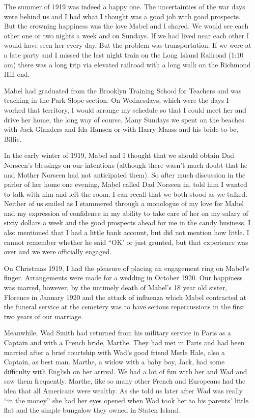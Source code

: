 \documentclass[12pt]{book}              %
\begin{document}

The summer of 1919 was indeed a happy one. The uncertainties of the war days were behind us and I had what I thought was a good job with good prospects. But the crowning happiness was the love Mabel and I shared. We would see each other one or two nights a week and on Sundays. If we had lived near each other I would have seen her every day. But the problem was transportation. If we were at a late party and I missed the last night train on the Long Island Railroad (1:10 am) there was a long trip via elevated railroad with a long walk on the Richmond Hill end. 

Mabel had graduated from the Brooklyn Training School for Teachers and was teaching in the Park Slope section. On Wednesdays, which were the days I worked that territory, I would arrange my schedule so that I could meet her and drive her home, the long way of course. Many Sundays we spent on the beaches with Jack Glanders and Ida Hansen or with Harry Maass and his bride-to-be, Billie. 

In the early winter of 1919, Mabel and I thought that we should obtain Dad Norseen's blessings on our intentions (although there wasn't much doubt that he and Mother Norseen had not anticipated them). So after much discussion in the parlor of her home one evening, Mabel called Dad Norseen in, told him I wanted to talk with him and left the room. I can recall that we both stood as we talked. Neither of us smiled as I stammered through a monologue of my love for Mabel and my expression of confidence in my ability to take care of her on my salary of sixty dollars a week and the good prospects ahead for me in the candy business. I also mentioned that I had a little bank account, but did not mention how little. I cannot remember whether he said ``OK' or just grunted, but that experience was over and we were officially engaged. 

On Christmas 1919, I had the pleasure of placing an engagement ring on Mabel's finger. Arrangements were made for a wedding in October 1920. Our happiness was marred, however, by the untimely death of Mabel's 18 year old sister, Florence in January 1920 and the attack of influenza which Mabel contracted at the funeral service at the cemetery was to have serious repercussions in the first two years of our marriage. 

Meanwhile, Wad Smith had returned from his military service in Paris as a Captain and with a French bride, Marthe. They had met in Paris and had been married after a brief courtship with Wad's good friend Merle Hale, also a Captain, as best man. Marthe, a widow with a baby boy, Jack, had some difficulty with English on her arrival. We had a lot of fun with her and Wad and saw them frequently. Marthe, like so many other French and Europeans had the idea that all Americans were wealthy. As she told us later after Wad was really ``in the money'' she had her eyes opened when Wad took her to his parents' little flat and the simple bungalow they owned in Staten Island. 
\end{document}
